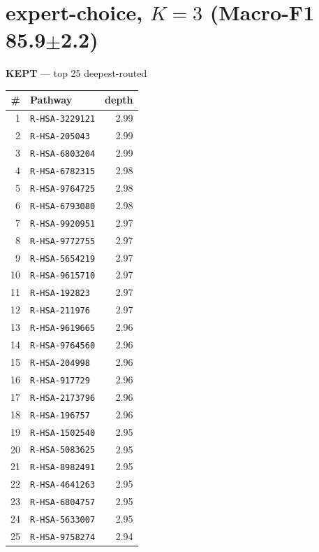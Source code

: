 \documentclass[10pt]{article}
\begin{document}
\section*{expert-choice, $K=3$  (Macro-F1 85.9$\pm$2.2)}
\filbreak
\begin{minipage}[t]{0.48\textwidth}\centering\textbf{\color{green!45!black}KEPT} --- top 25 deepest-routed\\[3pt]
\begin{tabular}{@{}r l r@{}}
\toprule
\# & Pathway & depth \\
\midrule
1 & \texttt{R-HSA-3229121} & 2.99 \\
2 & \texttt{R-HSA-205043} & 2.99 \\
3 & \texttt{R-HSA-6803204} & 2.99 \\
4 & \texttt{R-HSA-6782315} & 2.98 \\
5 & \texttt{R-HSA-9764725} & 2.98 \\
6 & \texttt{R-HSA-6793080} & 2.98 \\
7 & \texttt{R-HSA-9920951} & 2.97 \\
8 & \texttt{R-HSA-9772755} & 2.97 \\
9 & \texttt{R-HSA-5654219} & 2.97 \\
10 & \texttt{R-HSA-9615710} & 2.97 \\
11 & \texttt{R-HSA-192823} & 2.97 \\
12 & \texttt{R-HSA-211976} & 2.97 \\
13 & \texttt{R-HSA-9619665} & 2.96 \\
14 & \texttt{R-HSA-9764560} & 2.96 \\
15 & \texttt{R-HSA-204998} & 2.96 \\
16 & \texttt{R-HSA-917729} & 2.96 \\
17 & \texttt{R-HSA-2173796} & 2.96 \\
18 & \texttt{R-HSA-196757} & 2.96 \\
19 & \texttt{R-HSA-1502540} & 2.95 \\
20 & \texttt{R-HSA-5083625} & 2.95 \\
21 & \texttt{R-HSA-8982491} & 2.95 \\
22 & \texttt{R-HSA-4641263} & 2.95 \\
23 & \texttt{R-HSA-6804757} & 2.95 \\
24 & \texttt{R-HSA-5633007} & 2.95 \\
25 & \texttt{R-HSA-9758274} & 2.94 \\
\bottomrule
\end{tabular}
\end{minipage}\hfill
\end{document}
